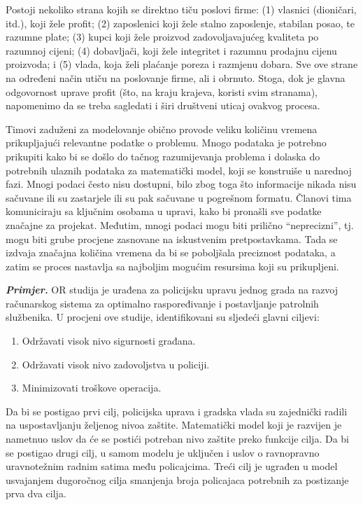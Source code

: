 \documentclass[a4paper, utf8, 11pt, colorlinks]{book}
\begin{document}
Postoji nekoliko strana kojih se direktno tiču poslovi firme: (1) vlasnici (dioničari, itd.), koji žele profit;   (2) zaposlenici koji žele stalno zaposlenje, stabilan posao, te razumne plate; (3) kupci koji žele proizvod zadovoljavajućeg kvaliteta po razumnoj cijeni;
(4) dobavljači, koji žele integritet i razumnu prodajnu cijenu proizvoda; i
(5) vlada, koja želi plaćanje poreza i razmjenu dobara. Sve ove strane na određeni način utiču na poslovanje firme, ali i obrnuto.  Stoga, dok je glavna odgovornost uprave profit (što, na kraju krajeva, koristi svim stranama), napomenimo da se treba sagledati i širi društveni uticaj ovakvog procesa. 
 
 Timovi zaduženi za modelovanje obično provode veliku količinu vremena prikupljajući relevantne podatke o problemu. Mnogo podataka je potrebno prikupiti kako bi se došlo do tačnog razumijevanja problema i dolaska do potrebnih ulaznih podataka za matematički model, koji se konstruiše u narednoj fazi.  Mnogi  podaci često nisu dostupni, bilo zbog toga što informacije nikada nisu sačuvane ili su zastarjele ili su pak sačuvane u pogrešnom formatu.   Članovi tima komuniciraju sa ključnim osobama u upravi, kako bi pronašli sve podatke značajne za projekat. Međutim, mnogi podaci mogu biti prilično ``neprecizni'', tj. mogu biti grube procjene zasnovane na iskustvenim pretpostavkama. Tada se izdvaja značajna količina vremena da bi se poboljšala  
preciznost podataka, a zatim se proces nastavlja sa najboljim mogućim resursima koji su prikupljeni. 

\textbf{\textit{Primjer.}}  OR studija je urađena za policijsku upravu jednog grada %
na razvoj računarskog sistema za optimalno raspoređivanje i postavljanje patrolnih službenika. U procjeni   ove studije, identifikovani su sljedeći glavni ciljevi:
\begin{enumerate}
    \item  Održavati visok nivo sigurnosti građana.
    \item  Održavati visok nivo zadovoljstva u policiji.
     \item Minimizovati troškove operacija.
\end{enumerate}
Da bi se postigao prvi cilj, policijska uprava i gradska vlada  su zajednički radili na uspostavljanju željenog nivoa zaštite.  Matematički model koji je razvijen je nametnuo uslov da će se postići potreban nivo zaštite preko funkcije cilja.  Da bi se postigao drugi cilj, u samom modelu je uključen i uslov o ravnopravno uravnotežnim radnim satima među policajcima. Treći cilj je ugrađen u model usvajanjem dugoročnog cilja smanjenja broja policajaca potrebnih za postizanje prva dva cilja. 
\end{document}
